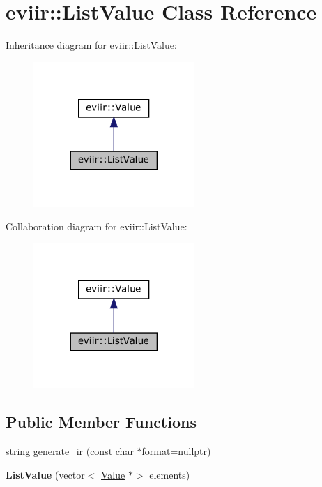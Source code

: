 \hypertarget{classeviir_1_1ListValue}{}\section{eviir\+:\+:List\+Value Class Reference}
\label{classeviir_1_1ListValue}


Inheritance diagram for eviir\+:\+:List\+Value\+:\nopagebreak
\begin{figure}[H]
\begin{center}
\leavevmode
\includegraphics[width=173pt]{classeviir_1_1ListValue__inherit__graph}
\end{center}
\end{figure}


Collaboration diagram for eviir\+:\+:List\+Value\+:\nopagebreak
\begin{figure}[H]
\begin{center}
\leavevmode
\includegraphics[width=173pt]{classeviir_1_1ListValue__coll__graph}
\end{center}
\end{figure}
\subsection*{Public Member Functions}
\begin{DoxyCompactItemize}
\item 
string \hyperlink{classeviir_1_1ListValue_ad12dee3774ad443ad0e27354909e8dc9}{generate\+\_\+ir} (const char $\ast$format=nullptr)
\item 
\mbox{\label{classeviir_1_1ListValue_af70222bf8a5987d7f076773eb908c331}} 
{\bfseries List\+Value} (vector$<$ \hyperlink{classeviir_1_1Value}{Value} $\ast$$>$ elements)
\end{DoxyCompactItemize}
